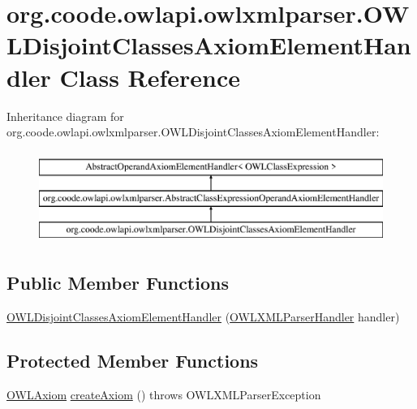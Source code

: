 \hypertarget{classorg_1_1coode_1_1owlapi_1_1owlxmlparser_1_1_o_w_l_disjoint_classes_axiom_element_handler}{\section{org.\-coode.\-owlapi.\-owlxmlparser.\-O\-W\-L\-Disjoint\-Classes\-Axiom\-Element\-Handler Class Reference}
\label{classorg_1_1coode_1_1owlapi_1_1owlxmlparser_1_1_o_w_l_disjoint_classes_axiom_element_handler}
}
Inheritance diagram for org.\-coode.\-owlapi.\-owlxmlparser.\-O\-W\-L\-Disjoint\-Classes\-Axiom\-Element\-Handler\-:\begin{figure}[H]
\begin{center}
\leavevmode
\includegraphics[height=3.000000cm]{classorg_1_1coode_1_1owlapi_1_1owlxmlparser_1_1_o_w_l_disjoint_classes_axiom_element_handler}
\end{center}
\end{figure}
\subsection*{Public Member Functions}
\begin{DoxyCompactItemize}
\item 
\hyperlink{classorg_1_1coode_1_1owlapi_1_1owlxmlparser_1_1_o_w_l_disjoint_classes_axiom_element_handler_a80f8c9cee7077d96b9521d966f714edc}{O\-W\-L\-Disjoint\-Classes\-Axiom\-Element\-Handler} (\hyperlink{classorg_1_1coode_1_1owlapi_1_1owlxmlparser_1_1_o_w_l_x_m_l_parser_handler}{O\-W\-L\-X\-M\-L\-Parser\-Handler} handler)
\end{DoxyCompactItemize}
\subsection*{Protected Member Functions}
\begin{DoxyCompactItemize}
\item 
\hyperlink{interfaceorg_1_1semanticweb_1_1owlapi_1_1model_1_1_o_w_l_axiom}{O\-W\-L\-Axiom} \hyperlink{classorg_1_1coode_1_1owlapi_1_1owlxmlparser_1_1_o_w_l_disjoint_classes_axiom_element_handler_a86f8b0923b695c3f48b3605ac870b3aa}{create\-Axiom} ()  throws O\-W\-L\-X\-M\-L\-Parser\-Exception 
\end{DoxyCompactItemize}


